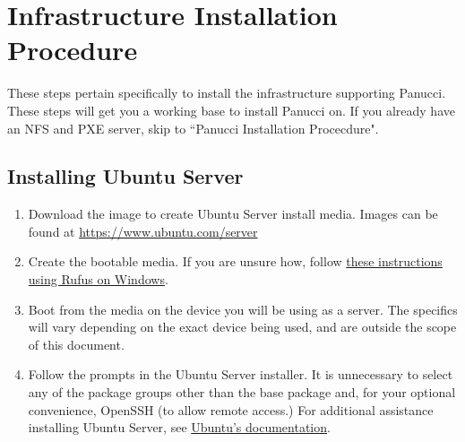 \documentclass{article}
\begin{document}
\pagebreak
\section{Infrastructure Installation Procedure}
These steps pertain specifically to install the infrastructure supporting Panucci.  These steps will get you a working base to install Panucci on.  If you already have an NFS and PXE server, skip to ``Panucci Installation Procecdure".
\subsection{Installing Ubuntu Server}
\begin{enumerate}
  \item Download the image to create Ubuntu Server install media.  Images can be found at \url{https://www.ubuntu.com/server}
  \item Create the bootable media.  If you are unsure how, follow \href{https://www.ubuntu.com/download/desktop/create-a-usb-stick-on-windows}{these instructions using Rufus on Windows}.
  \item Boot from the media on the device you will be using as a server.  The specifics will vary depending on the exact device being used, and are outside the scope of this document.
  \item Follow the prompts in the Ubuntu Server installer.  It is unnecessary to select any of the package groups other than the base package and, for your optional convenience, OpenSSH (to allow remote access.)  For additional assistance installing Ubuntu Server, see \href{https://www.ubuntu.com/download/server/install-ubuntu-server}{Ubuntu's documentation}.
\end{enumerate}
\end{document}
